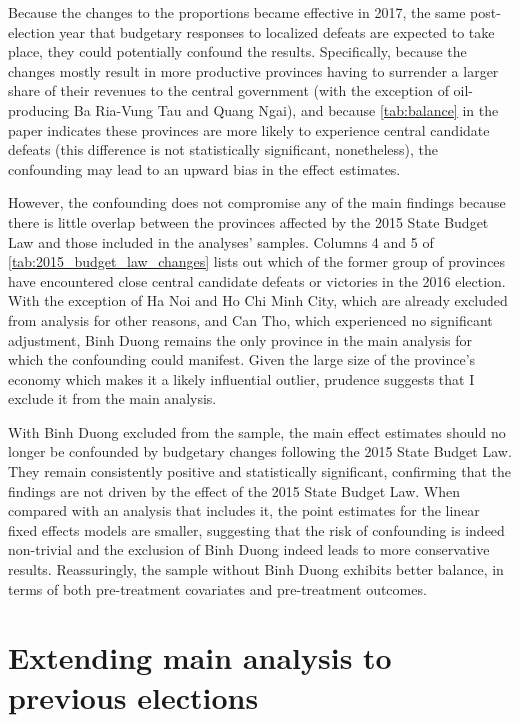 \documentclass[12pt]{article}
\newcommand{\1}{\mathbbm{1}}
\begin{document}
Because the changes to the proportions became effective in 2017, the same post-election year that budgetary responses to localized defeats are expected to take place, they could potentially confound the results. Specifically, because the changes mostly result in more productive provinces having to surrender a larger share of their revenues to the central government (with the exception of oil-producing Ba Ria-Vung Tau and Quang Ngai), and because \autoref{tab:balance} in the paper indicates these provinces are more likely to experience central candidate defeats (this difference is not statistically significant, nonetheless), the confounding may lead to an upward bias in the effect estimates.

However, the confounding does not compromise any of the main findings because there is little overlap between the provinces affected by the 2015 State Budget Law and those included in the analyses' samples. Columns 4 and 5 of \autoref{tab:2015_budget_law_changes} lists out which of the former group of provinces have encountered close central candidate defeats or victories in the 2016 election. With the exception of Ha Noi and Ho Chi Minh City, which are already excluded from analysis for other reasons, and Can Tho, which experienced no significant adjustment, Binh Duong remains the only province in the main analysis for which the confounding could manifest. Given the large size of the province's economy which makes it a likely influential outlier, prudence suggests that I exclude it from the main analysis.

With Binh Duong excluded from the sample, the main effect estimates should no longer be confounded by budgetary changes following the 2015 State Budget Law. They remain consistently positive and statistically significant, confirming that the findings are not driven by the effect of the 2015 State Budget Law. When compared with an analysis that includes it, the point estimates for the linear fixed effects models are smaller, suggesting that the risk of confounding is indeed non-trivial and the exclusion of Binh Duong indeed leads to more conservative results. Reassuringly, the sample without Binh Duong exhibits better balance, in terms of both pre-treatment covariates and pre-treatment outcomes.

\clearpage

\section{Extending main analysis to previous elections}
\end{document}
